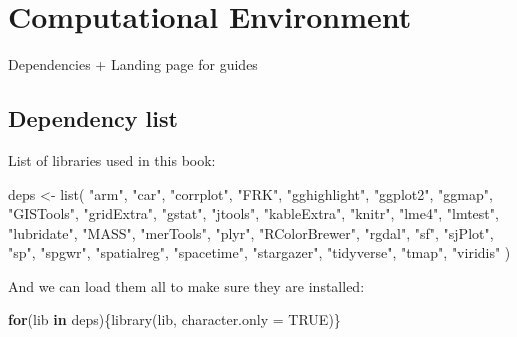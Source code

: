 \documentclass[
]{book}
\newenvironment{Shaded}{\begin{snugshade}}{\end{snugshade}}
\newcommand{\AttributeTok}[1]{\textcolor[rgb]{0.77,0.63,0.00}{#1}}
\newcommand{\ConstantTok}[1]{\textcolor[rgb]{0.00,0.00,0.00}{#1}}
\newcommand{\ControlFlowTok}[1]{\textcolor[rgb]{0.13,0.29,0.53}{\textbf{#1}}}
\newcommand{\FunctionTok}[1]{\textcolor[rgb]{0.00,0.00,0.00}{#1}}
\newcommand{\NormalTok}[1]{#1}
\newcommand{\OtherTok}[1]{\textcolor[rgb]{0.56,0.35,0.01}{#1}}
\newcommand{\StringTok}[1]{\textcolor[rgb]{0.31,0.60,0.02}{#1}}
\begin{document}
\hypertarget{computational-environment}{%
\section{Computational Environment}\label{computational-environment}}

Dependencies + Landing page for guides

\hypertarget{dependency-list}{%
\subsection{Dependency list}\label{dependency-list}}

List of libraries used in this book:

\begin{Shaded}
\begin{Highlighting}[]
\NormalTok{deps }\OtherTok{\textless{}{-}} \FunctionTok{list}\NormalTok{(}
    \StringTok{"arm"}\NormalTok{,}
    \StringTok{"car"}\NormalTok{,}
    \StringTok{"corrplot"}\NormalTok{,}
    \StringTok{"FRK"}\NormalTok{,}
    \StringTok{"gghighlight"}\NormalTok{,}
    \StringTok{"ggplot2"}\NormalTok{,}
    \StringTok{"ggmap"}\NormalTok{,}
    \StringTok{"GISTools"}\NormalTok{,}
    \StringTok{"gridExtra"}\NormalTok{,}
    \StringTok{"gstat"}\NormalTok{,}
    \StringTok{"jtools"}\NormalTok{,}
    \StringTok{"kableExtra"}\NormalTok{,}
    \StringTok{"knitr"}\NormalTok{,}
    \StringTok{"lme4"}\NormalTok{,}
    \StringTok{"lmtest"}\NormalTok{,}
    \StringTok{"lubridate"}\NormalTok{,}
    \StringTok{"MASS"}\NormalTok{,}
    \StringTok{"merTools"}\NormalTok{,}
    \StringTok{"plyr"}\NormalTok{,}
    \StringTok{"RColorBrewer"}\NormalTok{,}
    \StringTok{"rgdal"}\NormalTok{,}
    \StringTok{"sf"}\NormalTok{,}
    \StringTok{"sjPlot"}\NormalTok{,}
    \StringTok{"sp"}\NormalTok{,}
    \StringTok{"spgwr"}\NormalTok{,}
    \StringTok{"spatialreg"}\NormalTok{,}
    \StringTok{"spacetime"}\NormalTok{,}
    \StringTok{"stargazer"}\NormalTok{,}
    \StringTok{"tidyverse"}\NormalTok{,}
    \StringTok{"tmap"}\NormalTok{,}
    \StringTok{"viridis"}
\NormalTok{)}
\end{Highlighting}
\end{Shaded}

And we can load them all to make sure they are installed:

\begin{Shaded}
\begin{Highlighting}[]
\ControlFlowTok{for}\NormalTok{(lib }\ControlFlowTok{in}\NormalTok{ deps)\{}\FunctionTok{library}\NormalTok{(lib, }\AttributeTok{character.only =} \ConstantTok{TRUE}\NormalTok{)\}}
\end{Highlighting}
\end{Shaded}
\end{document}
